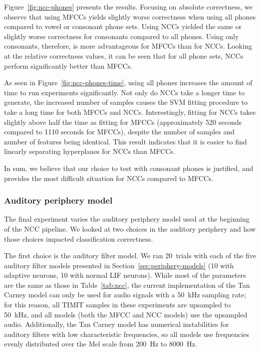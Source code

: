 Figure~\ref{fig:ncc-phones} presents the results.
Focusing on absolute correctness,
we observe that using MFCCs
yields slightly worse correctness
when using all phones compared
to vowel or consonant phone sets.
Using NCCs yielded the same
or slightly worse correctness
for consonants compared to all phones.
Using only consonants, therefore,
is more advantageous for MFCCs
than for NCCs.
Looking at the relative correctness values,
it can be seen that for all phone sets,
NCCs perform significantly better
than MFCCs.


As seen in Figure~\ref{fig:ncc-phones-time},
using all phones increases the
amount of time to run experiments significantly.
Not only do NCCs take a longer time to generate,
the increased number of samples
causes the SVM fitting procedure
to take a long time
for both MFCCs and NCCs.
Interestingly, fitting for NCCs
takes slightly above half
the time as fitting for MFCCs
(approximately 520 seconds
compared to 1110 seconds for MFCCs),
despite the number of samples
and number of features being identical.
This result indicates that it is
easier to find linearly separating hyperplanes
for NCCs than MFCCs.

In sum, we believe that our choice to
test with consonant phones
is justified,
and provides the most difficult
situation for NCCs compared to MFCCs.

\subsubsection{Auditory periphery model}
\label{sec:results-periphmodel}

The final experiment varies the auditory periphery model
used at the beginning of the NCC pipeline.
We looked at two choices in the auditory periphery
and how those choices impacted classification correctness.

The first choice is the auditory filter model.
We ran 20~trials with each of the five
auditory filter models presented
in Section~\ref{sec:periphery-models}
(10 with adaptive neurons, 10 with normal LIF neurons).
While most of the parameters are the same
as those in Table~\ref{tab:ncc},
the current implementation of the Tan Carney model
can only be used for audio signals
with a 50~kHz sampling rate;
for this reason, all TIMIT samples
in these experiments
are upsampled to 50~kHz,
and all models (both the MFCC and NCC models)
use the upsampled audio.
Additionally, the Tan Carney model
has numerical instabilities for auditory filters
with low characteristic frequencies,
so all models use frequencies
evenly distributed over the Mel scale
from 200~Hz to 8000~Hz.

